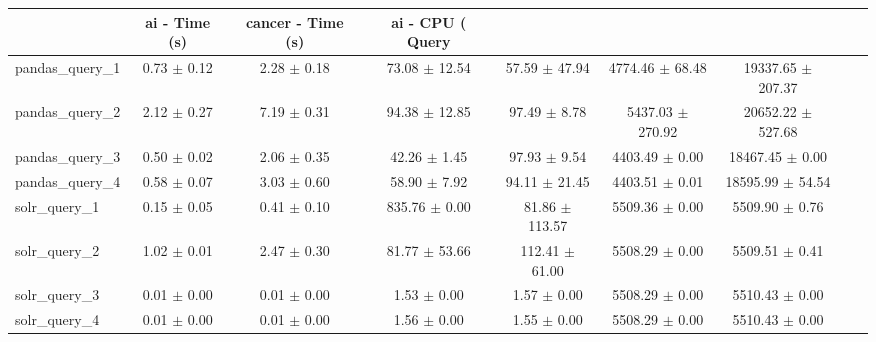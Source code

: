 \begin{tabular}{lcccccccc}
\toprule
 & ai - Time (s) & cancer - Time (s) & ai - CPU (%
Query &  &  &  &  &  &  \\
\midrule
pandas_query_1 & 0.73 \(\pm\) 0.12 & 2.28 \(\pm\) 0.18 & 73.08 \(\pm\) 12.54 & 57.59 \(\pm\) 47.94 & 4774.46 \(\pm\) 68.48 & 19337.65 \(\pm\) 207.37 \\
pandas_query_2 & 2.12 \(\pm\) 0.27 & 7.19 \(\pm\) 0.31 & 94.38 \(\pm\) 12.85 & 97.49 \(\pm\) 8.78 & 5437.03 \(\pm\) 270.92 & 20652.22 \(\pm\) 527.68 \\
pandas_query_3 & 0.50 \(\pm\) 0.02 & 2.06 \(\pm\) 0.35 & 42.26 \(\pm\) 1.45 & 97.93 \(\pm\) 9.54 & 4403.49 \(\pm\) 0.00 & 18467.45 \(\pm\) 0.00 \\
pandas_query_4 & 0.58 \(\pm\) 0.07 & 3.03 \(\pm\) 0.60 & 58.90 \(\pm\) 7.92 & 94.11 \(\pm\) 21.45 & 4403.51 \(\pm\) 0.01 & 18595.99 \(\pm\) 54.54 \\
solr_query_1 & 0.15 \(\pm\) 0.05 & 0.41 \(\pm\) 0.10 & 835.76 \(\pm\) 0.00 & 81.86 \(\pm\) 113.57 & 5509.36 \(\pm\) 0.00 & 5509.90 \(\pm\) 0.76 \\
solr_query_2 & 1.02 \(\pm\) 0.01 & 2.47 \(\pm\) 0.30 & 81.77 \(\pm\) 53.66 & 112.41 \(\pm\) 61.00 & 5508.29 \(\pm\) 0.00 & 5509.51 \(\pm\) 0.41 \\
solr_query_3 & 0.01 \(\pm\) 0.00 & 0.01 \(\pm\) 0.00 & 1.53 \(\pm\) 0.00 & 1.57 \(\pm\) 0.00 & 5508.29 \(\pm\) 0.00 & 5510.43 \(\pm\) 0.00 \\
solr_query_4 & 0.01 \(\pm\) 0.00 & 0.01 \(\pm\) 0.00 & 1.56 \(\pm\) 0.00 & 1.55 \(\pm\) 0.00 & 5508.29 \(\pm\) 0.00 & 5510.43 \(\pm\) 0.00 \\
\bottomrule
\end{tabular}
